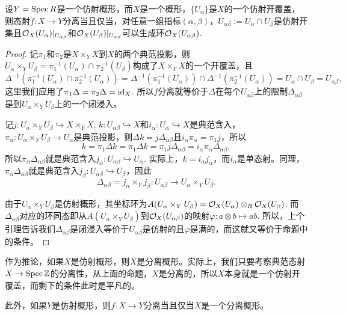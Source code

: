 \begin{pro}
	设$Y=\operatorname{Spec} R$是一个仿射概形，而$X$是一个概形，$\{U_\alpha\}$是$X$的一个仿射开覆盖，则态射$f:X\to Y$分离当且仅当，对任意一组指标$(\alpha,\beta)$，$U_{\alpha\beta}:=U_\alpha\cap U_\beta$是仿射开集且$\mathcal{O}_X(U_{\alpha})|_{U_{\alpha\beta}}$和$\mathcal{O}_X(U_{\beta})|_{U_{\alpha\beta}}$可以生成环$\mathcal{O}_X(U_{\alpha\beta})$.
\end{pro}

\begin{proof}
记$\pi_1$和$\pi_2$是$X\times_Y X$到$X$的两个典范投影，则$U_\alpha\times_Y U_\beta=\pi_1^{-1}(U_\alpha)\cap\pi_2^{-1}(U_\beta)$构成了$X\times_Y X$的一个开覆盖，且
\[
	\Delta^{-1}\left(\pi_1^{-1}(U_\alpha)\cap\pi_2^{-1}(U_\alpha)\right)=\Delta^{-1}\left(\pi_1^{-1}(U_\alpha)\right)\cap\Delta^{-1}\left(\pi_2^{-1}(U_\alpha)\right)=U_\alpha\cap U_\beta=U_{\alpha\beta},
\]
这里我们应用了$\pi_1\Delta=\pi_2\Delta=\operatorname{id}_X$. 
所以$f$分离就等价于$\Delta$在每个$U_{\alpha\beta}$上的限制$\Delta_{\alpha\beta}$是到$U_\alpha\times_Y U_\beta$上的一个闭浸入。

记$j:U_\alpha\times_Y U_\beta\hookrightarrow X \times_Y X$, $k:U_{\alpha\beta}\hookrightarrow X$和$i_\alpha:U_\alpha\hookrightarrow X$是典范含入，$\pi_\alpha:U_\alpha\times_Y U_\beta\to U_\alpha$是典范投影，则$\Delta k=j\Delta_{\alpha\beta}$且$i_\alpha\pi_\alpha=\pi_1j$，所以
\[
	k=\pi_1\Delta k=\pi_1\Delta k=\pi_1j\Delta_{\alpha\beta}=i_\alpha\pi_\alpha\Delta_{\alpha\beta},
\]
所以$\pi_\alpha\Delta_{\alpha\beta}$就是典范含入$j_\alpha:U_{\alpha\beta}\hookrightarrow U_\alpha$. 实际上，$k=i_\alpha j_\alpha$，而$i_\alpha$是单态射。同理，$\pi_\alpha\Delta_{\alpha\beta}$就是典范含入$j_\beta:U_{\alpha\beta}\hookrightarrow U_\beta$，因此
\[
	\Delta_{\alpha\beta}=j_\alpha\times_Y j_\beta:U_{\alpha\beta}\to U_\alpha\times_Y U_\beta.
\]

由于$U_\alpha\times_Y U_\beta$是仿射概形，其坐标环为$A(U_\alpha\times_Y U_\beta)=\mathcal{O}_X(U_\alpha)\otimes_{R}\mathcal{O}_X(U_\beta)$.
而$\Delta_{\alpha\beta}$对应的环同态即从$A(U_\alpha\times_Y U_\beta)$到$\mathcal{O}_X(U_{\alpha\beta})$的映射$\varphi:a\otimes b\mapsto ab$. 
所以，上个引理告诉我们$\Delta_{\alpha\beta}$是闭浸入等价于$U_{\alpha\beta}$是仿射的且$\varphi$是满的，而这就又等价于命题中的条件。
\end{proof}

作为推论，如果$X$是仿射概形，则$X$是分离概形。实际上，我们只要考察典范态射$X\to \operatorname{Spec} \mathbb{Z}$的分离性，从上面的命题，$X$是分离的，所以$X$本身就是一个仿射开覆盖，而剩下的条件此时是平凡的。

此外，如果$Y$是仿射概形，则$f:X\to Y$分离当且仅当$X$是一个分离概形。

